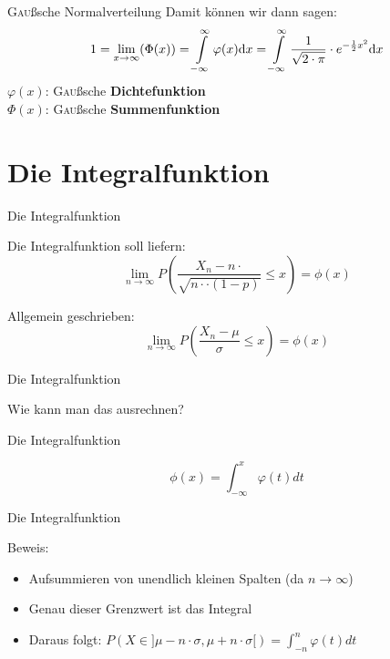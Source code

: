 \documentclass[14pt]{beamer}
\begin{document}
\begin{frame}{\textrm{\textsc{Gau}ß}sche Normalverteilung}
Damit können wir dann sagen:
$$
1= \lim\limits_{x \to \infty} (\Phi(x)) =  \int\displaylimits^{\infty}_{-\infty} \varphi(x) {\mathrm d}x = \int\displaylimits^{\infty}_{-\infty} \frac{1}{\sqrt{2\cdot \pi}} \cdot e^{-\frac{1}{2}x^2} {\mathrm d}x
$$
$\varphi(x)$: \textrm{\textsc{Gau}ß}sche \textbf{Dichtefunktion}\\
$\Phi(x)$:  \textrm{\textsc{Gau}ß}sche \textbf{Summenfunktion}
\end{frame}

\section{Die Integralfunktion}
\begin{frame} {Die Integralfunktion}

Die Integralfunktion soll liefern:
$$ \lim_{n \rightarrow \infty} P\left(\frac{X_n-n\cdotp}{\sqrt{n\cdotp\cdot(1-p)}} \le x\right) = \phi(x) $$

Allgemein geschrieben:
$$ \lim_{n \rightarrow \infty} P\left(\frac{X_n-\mu}{\sigma} \le x\right) = \phi(x) $$

\end{frame}

\begin{frame} {Die Integralfunktion}

Wie kann man das ausrechnen?

\end{frame}

\begin{frame} {Die Integralfunktion}

$$ \phi(x) = \int_{-\infty}^x \varphi(t)dt $$

\end{frame}

\begin{frame} {Die Integralfunktion}

Beweis:

 \begin{itemize}
  \item Aufsummieren von unendlich kleinen Spalten (da $n \rightarrow   \infty$)
  \item Genau dieser Grenzwert ist das Integral
  \item Daraus folgt: $ P(X \in ] \mu - n \cdot \sigma, \mu + n \cdot \sigma[) = \int_{-n}^{n}\varphi(t)dt $
 \end{itemize}

\end{frame}
\end{document}
